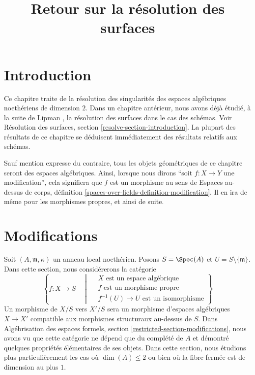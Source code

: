 

%


\title{Retour sur la résolution des surfaces}


\maketitle

\label{section-phantom}

\tableofcontents

\section{Introduction}
\label{section-introduction}

\noindent
Ce chapitre traite de la résolution des singularités des
espaces algébriques noethériens de dimension $2$.
Dans un chapitre antérieur, nous avons déjà étudié, à la suite de
Lipman \cite{Lipman}, la résolution des surfaces dans le cas des schémas.
Voir Résolution des surfaces, section
\ref{resolve-section-introduction}.
La plupart des résultats de ce chapitre se déduisent immédiatement
des résultats relatifs aux schémas.

\medskip\noindent
Sauf mention expresse du contraire, tous les objets géométriques
de ce chapitre seront des espaces algébriques. Ainsi, lorsque nous dirons
``soit $f : X \to Y$ une modification'', cela signifiera que
$f$ est un morphisme au sens de Espaces au-dessus de corps, définition
\ref{spaces-over-fields-definition-modification}.
Il en ira de même pour les morphismes propres, et ainsi de suite.










\section{Modifications}
\label{section-modifications}

\noindent
Soit $(A, \mathfrak m, \kappa)$ un anneau local noethérien. Posons
$S = \Spec(A)$ et $U = S \setminus \{\mathfrak m\}$. Dans cette section,
nous considérerons la catégorie
\begin{equation}
\label{equation-modification}
\left\{
f : X \longrightarrow S
\quad \middle| \quad
\begin{matrix}
X\text{ est un espace algébrique}\\
f\text{ est un morphisme propre}\\
f^{-1}(U) \to U\text{ est un isomorphisme}
\end{matrix}
\right\}
\end{equation}
Un morphisme de $X/S$ vers $X'/S$ sera un morphisme d'espaces algébriques
$X \to X'$ compatible aux morphismes structuraux au-dessus de $S$. Dans
Algébrisation des espaces formels, section
\ref{restricted-section-modifications}, nous avons vu que cette catégorie
ne dépend que du complété de $A$ et démontré quelques propriétés élémentaires
de ses objets. Dans cette section, nous étudions plus particulièrement les cas
où $\dim(A) \leq 2$ ou bien où la fibre fermée est de dimension au plus $1$.

